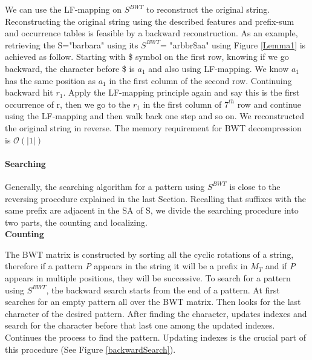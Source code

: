 \documentclass[11pt,a4paper]{report}
\begin{document}
We can use the LF-mapping on $S^{ BWT}$ to reconstruct the original string. 
Reconstructing the original string using the described features and prefix-sum
and occurrence tables is feasible by a backward reconstruction. As an example, 
retrieving the S="barbara" using its $S^{BWT}$= "arbbr\$aa" using Figure 
\ref{Lemma1} is achieved as follow. Starting with \$ symbol on the first row, 
knowing if we go backward, the character before \$ is $a_1$ and also using 
LF-mapping. We know $a_1$ has the same position as $a_1$ in the first column of
the second row. Continuing backward hit $r_1$. Apply the LF-mapping principle 
again and say this is the first occurrence of r, then we go to the  $r_1$ in 
the first column of $7^{th}$ row and continue using the LF-mapping and then walk
back one step and so on. We reconstructed the original string in reverse. 
The memory requirement for BWT decompression is $\mathcal{O}(\lvert 1 \rvert)$ \\



\paragraph{Searching}

Generally, the searching algorithm for a pattern using $S^{BWT}$ is close to
the reversing procedure explained in the last Section. Recalling that suffixes 
with the same prefix are adjacent in the SA of S, we divide the searching procedure 
into two parts, the counting and localizing.\\


\textbf{Counting}

The BWT matrix is constructed by sorting all the cyclic rotations of a string, 
therefore if a pattern \emph{P} appears in the string it will be a prefix in $M_{T}$ 
and if \emph {P} appears in multiple positions, they will be successive. To search 
for a pattern using $S^{BWT}$, the backward search starts from the end of a pattern.
At first searches for an empty  pattern all over the BWT matrix. Then looks for the 
last character of the desired pattern. After finding the character, updates indexes 
and search for the character before that last one among the updated indexes.
Continues the process to find the pattern. Updating indexes is the crucial part 
of this procedure (See Figure \ref{backwardSearch}).\\\\
\end{document}
